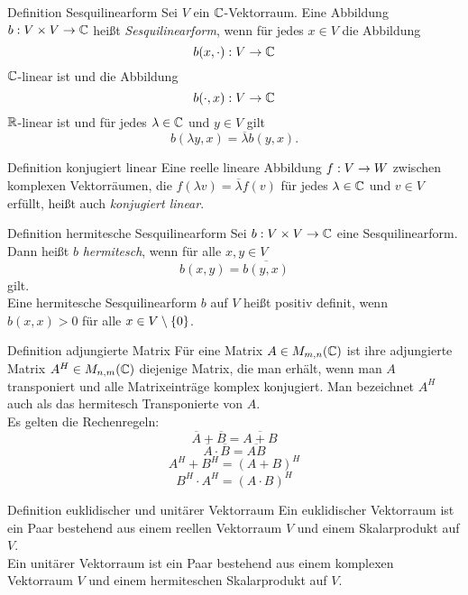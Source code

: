 \documentclass[main.tex]{subfiles}
\begin{document}
\begin{karte}{Definition Sesquilinearform}
    Sei \(V\) ein \(\mathbb{C}\)-Vektorraum. Eine Abbildung \(b : V\times V \rightarrow \mathbb{C}\)
    heißt \textit{Sesquilinearform}, wenn für jedes \(x\in V\) die Abbildung
    \[ b(x, \cdot) : V \rightarrow \mathbb{C} \]
    \(\mathbb{C}\)-linear ist und die Abbildung
    \[ b(\cdot, x) : V \rightarrow \mathbb{C} \]
    \(\mathbb{R}\)-linear ist und für jedes \(\lambda \in \mathbb{C}\) und \(y \in V\) gilt
    \[ b(\lambda y, x) = \overline{\lambda} b(y,x). \]
\end{karte}

\begin{karte}{Definition konjugiert linear}
    Eine reelle lineare Abbildung \(f : V \rightarrow W\) zwischen komplexen Vektorräumen,
    die \(f(\lambda v) = \overline{\lambda}f(v)\) für jedes \(\lambda \in \mathbb{C}\)
    und \(v \in V\) erfüllt, heißt auch \textit{konjugiert linear}.
\end{karte}

\begin{karte}{Definition hermitesche Sesquilinearform}
    Sei \(b : V\times V \rightarrow \mathbb{C}\) eine Sesquilinearform. 
    Dann heißt \(b\) \textit{hermitesch},
    wenn für alle \(x,y \in V\)
    \[ b(x,y) = \overline{b(y,x)} \]
    gilt.\\
    Eine hermitesche Sesquilinearform \(b\) auf \(V\) heißt positiv definit,
    wenn \(b(x,x) > 0\) für alle \(x \in V \setminus \{0\}\).
\end{karte}

\begin{karte}{Definition adjungierte Matrix}
    Für eine Matrix \(A \in M_{m,n}(\mathbb{C})\) ist ihre 
    adjungierte Matrix \(A^H \in M_{n,m}(\mathbb{C})\)
    diejenige Matrix, die man erhält, wenn man 
    \(A\) transponiert und alle Matrixeinträge 
    komplex konjugiert. Man bezeichnet \(A^H\) 
    auch als das hermitesch Transponierte von \(A\).\\
    Es gelten die Rechenregeln:\\
    \[ \overline{A} + \overline{B} = \overline{A + B} \]
    \[ \overline{A} \cdot \overline{B} = \overline{AB} \]
    \[ A^H + B^H = (A + B)^H \]
    \[ B^H \cdot A^H = (A \cdot B)^H \]
\end{karte}

\begin{karte}{Definition euklidischer und unitärer Vektorraum}
    Ein euklidischer Vektorraum ist ein Paar bestehend aus einem reellen Vektorraum \(V\)
    und einem Skalarprodukt auf \(V\).\\
    Ein unitärer Vektorraum ist ein Paar bestehend aus einem komplexen Vektorraum \(V\) und
    einem hermiteschen Skalarprodukt auf \(V\).
\end{karte}
\end{document}
